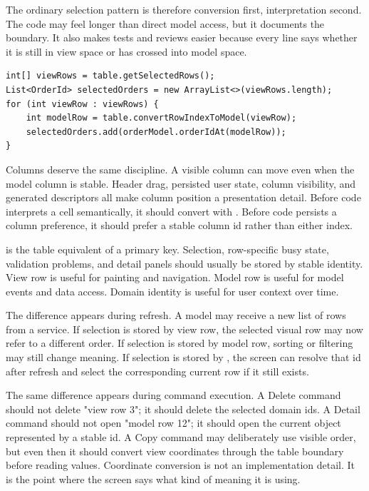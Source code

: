 The ordinary selection pattern is therefore conversion first, interpretation second. The code may feel longer than direct model access, but it documents the boundary. It also makes tests and reviews easier because every line says whether it is still in view space or has crossed into model space.

\begin{lstlisting}[caption={Converting selected rows to model rows before reading the model.}]
int[] viewRows = table.getSelectedRows();
List<OrderId> selectedOrders = new ArrayList<>(viewRows.length);
for (int viewRow : viewRows) {
    int modelRow = table.convertRowIndexToModel(viewRow);
    selectedOrders.add(orderModel.orderIdAt(modelRow));
}
\end{lstlisting}

Columns deserve the same discipline. A visible column can move even when the model column is stable. Header drag, persisted user state, column visibility, and generated descriptors all make column position a presentation detail. Before code interprets a cell semantically, it should convert  with . Before code persists a column preference, it should prefer a stable column id rather than either index.

 is the table equivalent of a primary key. Selection, row-specific busy state, validation problems, and detail panels should usually be stored by stable identity. View row is useful for painting and navigation. Model row is useful for model events and data access. Domain identity is useful for user context over time.

The difference appears during refresh. A model may receive a new list of rows from a service. If selection is stored by view row, the selected visual row may now refer to a different order. If selection is stored by model row, sorting or filtering may still change meaning. If selection is stored by , the screen can resolve that id after refresh and select the corresponding current row if it still exists.

The same difference appears during command execution. A Delete command should not delete "view row 3"; it should delete the selected domain ids. A Detail command should not open "model row 12"; it should open the current object represented by a stable id. A Copy command may deliberately use visible order, but even then it should convert view coordinates through the table boundary before reading values. Coordinate conversion is not an implementation detail. It is the point where the screen says what kind of meaning it is using.

